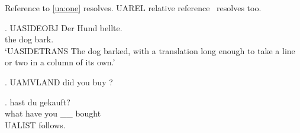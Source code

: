 Reference to \ref{ua:one} resolves.
UAREL relative reference \Last\ resolves too.

\begin{exe}
\end{exe}

{\GlossTransSide
\exg. UASIDEOBJ Der Hund bellte.\\ the dog bark.\\
\glt `UASIDETRANS The dog barked, with a translation long enough to take a
      line or two in a column of its own.'
}

\ex. UAMVLAND  did you buy ?

\exg.  hast du  gekauft?\\
      what have you \_\_ bought\\

UALIST follows.
\lpzglist


